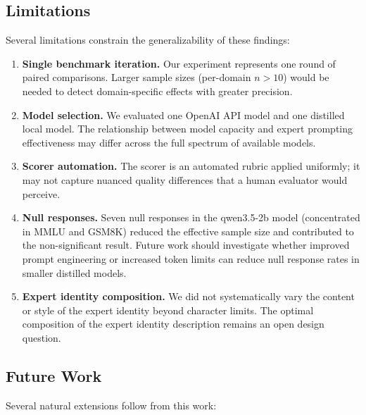 \documentclass[anonymous, submission, paper]{iclr2026}
\begin{document}
\subsection{Limitations}
\label{sec:limitations}

Several limitations constrain the generalizability of these findings:

\begin{enumerate}
  \item \textbf{Single benchmark iteration.} Our experiment represents one round of paired comparisons. Larger sample sizes (per-domain $n > 10$) would be needed to detect domain-specific effects with greater precision.

  \item \textbf{Model selection.} We evaluated one OpenAI API model and one distilled local model. The relationship between model capacity and expert prompting effectiveness may differ across the full spectrum of available models.

  \item \textbf{Scorer automation.} The scorer is an automated rubric applied uniformly; it may not capture nuanced quality differences that a human evaluator would perceive.

  \item \textbf{Null responses.} Seven null responses in the qwen3.5-2b model (concentrated in MMLU and GSM8K) reduced the effective sample size and contributed to the non-significant result. Future work should investigate whether improved prompt engineering or increased token limits can reduce null response rates in smaller distilled models.

  \item \textbf{Expert identity composition.} We did not systematically vary the content or style of the expert identity beyond character limits. The optimal composition of the expert identity description remains an open design question.
\end{enumerate}

\subsection{Future Work}
\label{sec:future_work}

Several natural extensions follow from this work:
\end{document}
